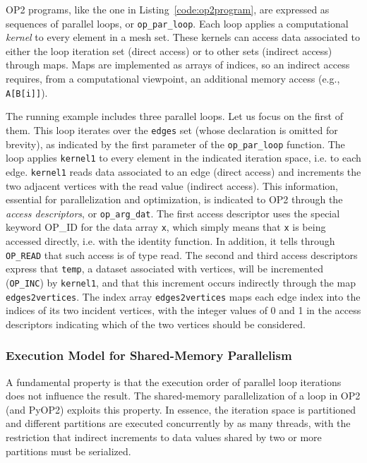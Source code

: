 OP2 programs, like the one in Listing~\ref{code:op2program}, are expressed as sequences of parallel loops, or {\tt op\_par\_loop}. Each loop applies a computational {\em kernel} to every element in a mesh set. These kernels can access data associated to either the loop iteration set (direct access) or to other sets (indirect access) through maps. Maps are implemented as arrays of indices, so an indirect access requires, from a computational viewpoint, an additional memory access (e.g., \texttt{A[B[i]]}).

The running example includes three parallel loops. Let us focus on the first of them. This loop iterates over the {\tt edges} set (whose declaration is omitted for brevity), as indicated by the first parameter of the {\tt op\_par\_loop} function. The loop applies {\tt kernel1} to every element in the indicated iteration space, i.e. to each edge. {\tt kernel1} reads data associated to an edge (direct access) and increments the two adjacent vertices with the read value (indirect access). This information, essential for parallelization and optimization, is indicated to OP2 through the {\em access descriptors}, or {\tt op\_arg\_dat}. The first access descriptor uses the special keyword OP\_ID for the data array {\tt x}, which simply means that {\tt x} is being accessed directly, i.e. with the identity function. In addition, it tells through {\tt OP\_READ} that such access is of type read. The second and third access descriptors express that {\tt temp}, a dataset associated with vertices, will be incremented ({\tt OP\_INC}) by {\tt kernel1}, and that this increment occurs indirectly through the map {\tt edges2vertices}. The index array {\tt edges2vertices} maps each edge index into the indices of its two incident vertices, with the integer values of 0 and 1 in the access descriptors indicating which of the two vertices should be considered.


\subsubsection{Execution Model for Shared-Memory Parallelism}
A fundamental property is that the execution order of parallel loop iterations does not influence the result. The shared-memory parallelization of a loop in OP2 (and PyOP2) exploits this property. In essence, the iteration space is partitioned and different partitions are executed concurrently by as many threads, with the restriction that indirect increments to data values shared by two or more partitions must be serialized.

